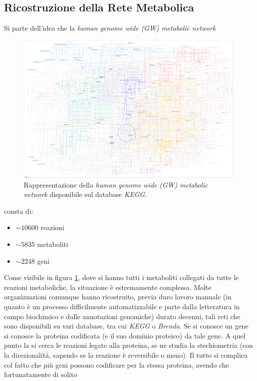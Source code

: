 \documentclass[a4paper,12pt, oneside]{book}
\begin{document}
\subsection{Ricostruzione della Rete Metabolica}
Si parte dell'idea che la \textit{human genome wide (GW) metabolic network}
\begin{figure}
  \centering
  \includegraphics[width=\textwidth]{img/hsa01100.png}
  \caption{Rappresentazione della \textit{human genome wide (GW) metabolic
      network} disponibile sul database \textit{KEGG}.}
  \label{fig:gwmeta}
\end{figure}
consta di:
\begin{itemize}
  \item $\sim 10600$ reazioni
  \item $\sim 5835$ metaboliti
  \item $\sim 2248$ geni
\end{itemize}
Come visibile in figura \ref{fig:gwmeta}, dove si hanno tutti i metaboliti
collegati da tutte le
reazioni metaboliche, la situazione è estremamente complessa. Molte
organizzazioni comunque hanno ricostruito, previa duro lavoro manuale (in quanto
è un processo difficilmente automatizzabile e parte dalla letteratura in campo
biochimico e dalle annotazioni genomiche) durato decenni, tali reti
che sono disponibili su vari database, tra cui \textit{KEGG} o
\textit{Brenda}.
Se si conosce un gene si conosce la proteina codificata (e il suo dominio
proteico) da tale gene. A quel punto la si cerca le reazioni legate alla
proteina, se ne studia la stechiometria (con la direzionalità, sapendo se la
reazione è reversibile o meno). Il tutto si complica col fatto che più geni
possono codificare per la stessa proteina, avendo che fortunatamente di solito
\end{document}
